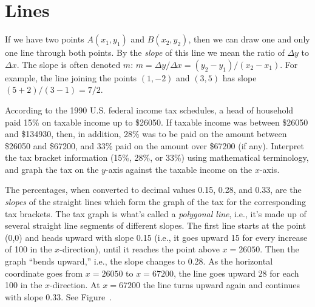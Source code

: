 \section{Lines}{}{}

If we have two points $A(x_1,y_1)$ and $B(x_2,y_2)$, then we can draw one
and only one line through both points.  By the {\it slope} of this line
we mean the ratio of $\Delta y$ to $\Delta x$.  The slope is often denoted
$m$: $m=\Delta y/\Delta x=(y_2-y_1)/(x_2-x_1)$.  For example, the line
joining the points $(1,-2)$ and $(3,5)$ has slope
$(5+2)/(3-1)=7/2$.



\begin{example} According to the 1990 U.S. federal income tax schedules, a head
of household paid 15\% on taxable income up to \$26050. If taxable
income was between \$26050 and \$134930, then, in addition, 28\% was to
be paid on the amount between \$26050 and \$67200, and 33\% paid on
the amount over \$67200 (if any).  Interpret the tax bracket
information (15\%, 28\%, or 33\%) using mathematical terminology, and
graph the tax on the $y$-axis against the taxable income on the
$x$-axis.

The percentages, when converted to decimal values 0.15, 0.28, and 0.33,
are the {\it slopes} of the straight lines which form the graph of the
tax for
the corresponding tax brackets.  The tax graph is what's called a
{\it polygonal line}, i.e., it's made up of several straight line segments
of different slopes.  The first line starts at the point (0,0) and heads
upward with slope 0.15 (i.e., it goes upward 15 for every increase of
100 in the $x$-direction), until it reaches the point above $x=26050$.
Then the graph ``bends upward,'' i.e., the slope changes to 0.28.  As
the horizontal coordinate goes from $x=26050$ to $x=67200$, the line
goes upward 28 for each 100 in the $x$-direction.  At $x=67200$ the
line turns upward again and continues with slope 0.33.  See
Figure~.
\end{example}

%

